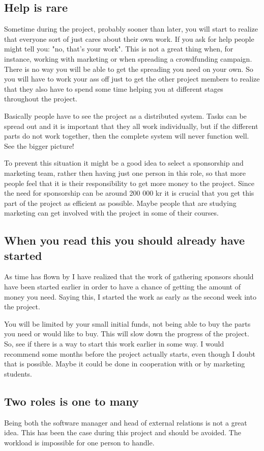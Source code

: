 \subsection{Help is rare}
Sometime during the project, probably sooner than later, you will start to realize that everyone sort of just cares about their own work. If you ask for help people might tell you: "no, that's your work". This is not a great thing when, for instance,  working with marketing or when spreading a crowdfunding campaign. There is no way you will be able to get the spreading you need on your own. So you will have to work your ass off just to get the other project members to realize that they also have to spend some time helping you at different stages throughout the project. 

Basically people have to see the project as a distributed system. Tasks can be spread out and it is important that they all work individually, but if the different parts do not work together, then the complete system will never function well. See the bigger picture! 

To prevent this situation it might be a good idea to select a sponsorship and marketing team, rather then having just one person in this role, so that more people feel that it is their responsibility to get more money to the project. Since the need for sponsorship can be around 200 000 kr it is crucial that you get this part of the project as efficient as possible. Maybe people that are studying marketing can get involved with the project in some of their courses. 

\subsection{When you read this you should already have started}
As time has flown by I have realized that the work of gathering sponsors should have been started earlier in order to have a chance of getting the amount of money you need. Saying this, I started the work as early as the second week into the project. 

You will be limited by your small initial funds, not being able to buy the parts you need or would like to buy. This will slow down the progress of the project. So, see if there is a way to start this work earlier in some way. I would recommend some months before the project actually starts, even though I doubt that is possible. Maybe it could be done in cooperation with or by marketing students.

\subsection{Two roles is one to many}
Being both the software manager and head of external relations is not a great idea. This has been the case during this project and should be avoided. The workload is impossible for one person to handle.